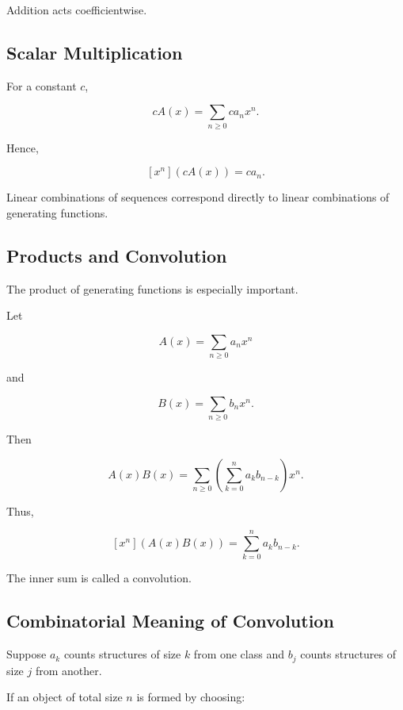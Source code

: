 Addition acts coefficientwise.

\subsection{Scalar Multiplication}
\label{subsec:gf-scalar-multiplication}

For a constant \(c\),

\[
cA(x)
=
\sum_{n\geq0}ca_nx^n.
\]

Hence,

\[
\boxed{
[x^n](cA(x))=ca_n.
}
\]

Linear combinations of sequences correspond directly to linear
combinations of generating functions.

\subsection{Products and Convolution}
\label{subsec:gf-products-convolution}

The product of generating functions is especially important.

Let

\[
A(x)=\sum_{n\geq0}a_nx^n
\]

and

\[
B(x)=\sum_{n\geq0}b_nx^n.
\]

Then

\[
A(x)B(x)
=
\sum_{n\geq0}
\left(
\sum_{k=0}^{n}a_kb_{n-k}
\right)x^n.
\]

Thus,

\[
\boxed{
[x^n](A(x)B(x))
=
\sum_{k=0}^{n}a_kb_{n-k}.
}
\]

The inner sum is called a convolution.

\subsection{Combinatorial Meaning of Convolution}
\label{subsec:combinatorial-convolution}

Suppose \(a_k\) counts structures of size \(k\) from one class and
\(b_j\) counts structures of size \(j\) from another.

If an object of total size \(n\) is formed by choosing:

